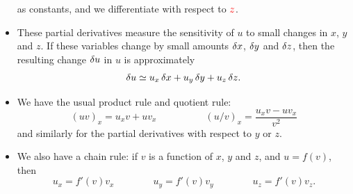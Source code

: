 \documentclass[9pt]{beamer}
\begin{document}
\begin{frame}[t]
\begin{itemize}
{   as constants, and we differentiate with respect to
   ${\color{red}z}$.}
  \item<6-> These partial derivatives measure the sensitivity of $u$
   to small changes in $x$, $y$ and $z$.  If these variables change by
   small amounts $\delta x$, $\delta y$ and $\delta z$, then the resulting
   change $\delta u$ in $u$ is approximately 
   \[ \delta u \simeq u_x\,\delta x + u_y\,\delta y + u_z\,\delta z. \]
  \item<7-> We have the usual product rule and quotient rule:
   \[ (uv)_x = u_x v + u v_x \hspace{5em} 
      (u/v)_x = \frac{u_xv-uv_x}{v^2}
   \]
   and similarly for the partial derivatives with respect to $y$ or $z$.
  \item<8-> We also have a chain rule: if $v$ is a function of $x$,
   $y$ and $z$, and $u=f(v)$, then 
   \[ u_x = f'(v)v_x \hspace{4em}
      u_y = f'(v)v_y \hspace{4em}
      u_z = f'(v)v_z.
   \] 
 \end{itemize}
\end{frame}
\end{document}
